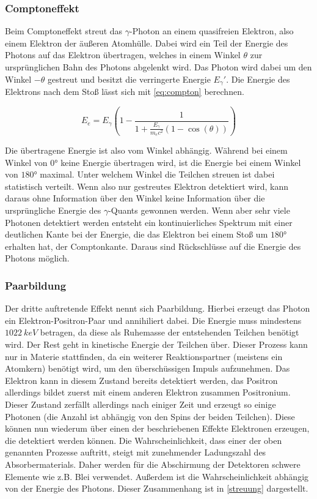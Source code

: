 \subsubsection{Comptoneffekt}
Beim Comptoneffekt streut das $\gamma$-Photon an einem quasifreien Elektron, also einem Elektron der äußeren Atomhülle. Dabei wird ein Teil der Energie des Photons auf das Elektron übertragen, welches in einem Winkel $\theta$ zur ursprünglichen Bahn des Photons abgelenkt wird. Das Photon wird dabei um den Winkel $-\theta$ gestreut und besitzt die verringerte Energie $E_\gamma'$. Die Energie des Elektrons nach dem Stoß lässt sich mit \cref{eq:compton} berechnen.

\begin{equation}
	E_e = E_\gamma \left( 1-\frac{1}{1 + \frac{E_\gamma}{m_ec^2}\left( 1-\cos\left(\theta\right)\right)}\right)
	\label{eq:compton}
\end{equation}

Die übertragene Energie ist also vom Winkel abhängig. Während bei einem Winkel von $0$° keine Energie übertragen wird, ist die Energie bei einem Winkel von $180$° maximal. Unter welchem Winkel die Teilchen streuen ist dabei statistisch verteilt. Wenn also nur gestreutes Elektron detektiert wird, kann daraus ohne Information über den Winkel keine Information über die ursprüngliche Energie des $\gamma$-Quants gewonnen werden. Wenn aber sehr viele Photonen detektiert werden entsteht ein kontinuierliches Spektrum mit einer deutlichen Kante bei der Energie, die das Elektron bei einem Stoß um $180$° erhalten hat, der Comptonkante. Daraus sind Rückschlüsse auf die Energie des Photons möglich.

\subsubsection{Paarbildung}
Der dritte auftretende Effekt nennt sich Paarbildung. Hierbei erzeugt das Photon ein Elektron-Positron-Paar und annihiliert dabei. Die Energie muss mindestens $\SI{1022}{keV}$ betragen, da diese als Ruhemasse der entstehenden Teilchen benötigt wird. Der Rest geht in kinetische Energie der Teilchen über. Dieser Prozess kann nur in Materie stattfinden, da ein weiterer Reaktionspartner (meistens ein Atomkern) benötigt wird, um den überschüssigen Impuls aufzunehmen. Das Elektron kann in diesem Zustand bereits detektiert werden, das Positron allerdings bildet zuerst mit einem anderen Elektron zusammen Positronium. Dieser Zustand zerfällt allerdings nach einiger Zeit und erzeugt so einige Photonen (die Anzahl ist abhängig von den Spins der beiden Teilchen). Diese können nun wiederum über einen der beschriebenen Effekte Elektronen erzeugen, die detektiert werden können. Die Wahrscheinlichkeit, dass einer der oben genannten Prozesse auftritt, steigt mit zunehmender Ladungszahl des Absorbermaterials. Daher werden für die Abschirmung der Detektoren schwere Elemente wie z.B. Blei verwendet. Außerdem ist die Wahrscheinlichkeit abhängig von der Energie des Photons. Dieser Zusammenhang ist in \cref{streuung} dargestellt.

